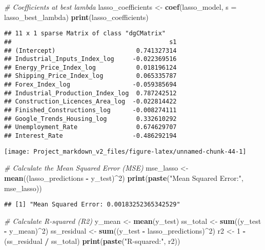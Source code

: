 \documentclass[
]{article}
\newenvironment{Shaded}{\begin{snugshade}}{\end{snugshade}}
\newcommand{\AttributeTok}[1]{\textcolor[rgb]{0.13,0.29,0.53}{#1}}
\newcommand{\CommentTok}[1]{\textcolor[rgb]{0.56,0.35,0.01}{\textit{#1}}}
\newcommand{\DecValTok}[1]{\textcolor[rgb]{0.00,0.00,0.81}{#1}}
\newcommand{\FunctionTok}[1]{\textcolor[rgb]{0.13,0.29,0.53}{\textbf{#1}}}
\newcommand{\NormalTok}[1]{#1}
\newcommand{\OtherTok}[1]{\textcolor[rgb]{0.56,0.35,0.01}{#1}}
\newcommand{\SpecialCharTok}[1]{\textcolor[rgb]{0.81,0.36,0.00}{\textbf{#1}}}
\newcommand{\StringTok}[1]{\textcolor[rgb]{0.31,0.60,0.02}{#1}}
\begin{document}
\begin{Shaded}
\begin{Highlighting}[]
\CommentTok{\# Coefficients at best lambda}
\NormalTok{lasso\_coefficients }\OtherTok{\textless{}{-}} \FunctionTok{coef}\NormalTok{(lasso\_model, }\AttributeTok{s =}\NormalTok{ lasso\_best\_lambda)}
\FunctionTok{print}\NormalTok{(lasso\_coefficients)}
\end{Highlighting}
\end{Shaded}

\begin{verbatim}
## 11 x 1 sparse Matrix of class "dgCMatrix"
##                                           s1
## (Intercept)                      0.741327314
## Industrial_Inputs_Index_log     -0.022369516
## Energy_Price_Index_log           0.018196124
## Shipping_Price_Index_log         0.065335787
## Forex_Index_log                 -0.059385694
## Industrial_Production_Index_log  0.787242512
## Construction_Licences_Area_log  -0.022814422
## Finished_Constructions_log      -0.008274111
## Google_Trends_Housing_log        0.332610292
## Unemployment_Rate                0.674629707
## Interest_Rate                   -0.486292194
\end{verbatim}

\begin{center}\texttt{[image: Project\_markdown\_v2\_files/figure-latex/unnamed-chunk-44-1]} \end{center}

\begin{Shaded}
\begin{Highlighting}[]
\CommentTok{\# Calculate the Mean Squared Error (MSE)}
\NormalTok{mse\_lasso }\OtherTok{\textless{}{-}} \FunctionTok{mean}\NormalTok{((lasso\_predictions }\SpecialCharTok{{-}}\NormalTok{ y\_test)}\SpecialCharTok{\^{}}\DecValTok{2}\NormalTok{)}
\FunctionTok{print}\NormalTok{(}\FunctionTok{paste}\NormalTok{(}\StringTok{"Mean Squared Error:"}\NormalTok{, mse\_lasso))}
\end{Highlighting}
\end{Shaded}

\begin{verbatim}
## [1] "Mean Squared Error: 0.00183252365342529"
\end{verbatim}

\begin{Shaded}
\begin{Highlighting}[]
\CommentTok{\# Calculate R{-}squared (R2)}
\NormalTok{y\_mean }\OtherTok{\textless{}{-}} \FunctionTok{mean}\NormalTok{(y\_test)}
\NormalTok{ss\_total }\OtherTok{\textless{}{-}} \FunctionTok{sum}\NormalTok{((y\_test }\SpecialCharTok{{-}}\NormalTok{ y\_mean)}\SpecialCharTok{\^{}}\DecValTok{2}\NormalTok{)}
\NormalTok{ss\_residual }\OtherTok{\textless{}{-}} \FunctionTok{sum}\NormalTok{((y\_test }\SpecialCharTok{{-}}\NormalTok{ lasso\_predictions)}\SpecialCharTok{\^{}}\DecValTok{2}\NormalTok{)}
\NormalTok{r2 }\OtherTok{\textless{}{-}} \DecValTok{1} \SpecialCharTok{{-}}\NormalTok{ (ss\_residual }\SpecialCharTok{/}\NormalTok{ ss\_total)}
\FunctionTok{print}\NormalTok{(}\FunctionTok{paste}\NormalTok{(}\StringTok{"R{-}squared:"}\NormalTok{, r2))}
\end{Highlighting}
\end{Shaded}
\end{document}
